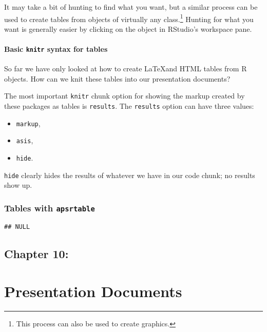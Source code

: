 \documentclass[ChapterTOCs,krantz1]{krantz}\usepackage{graphicx, color}
\makeatletter
\newenvironment{kframe}{%
 \def\at@end@of@kframe{}%
 \ifinner\ifhmode%
  \def\at@end@of@kframe{\end{minipage}}%
  \begin{minipage}{\columnwidth}%
 \fi\fi%
 \def\FrameCommand##1{\hskip\@totalleftmargin \hskip-\fboxsep
 \colorbox{shadecolor}{##1}\hskip-\fboxsep
     \hskip-\linewidth \hskip-\@totalleftmargin \hskip\columnwidth}%
 \MakeFramed {\advance\hsize-\width
   \@totalleftmargin\z@ \linewidth\hsize
   \@setminipage}}%
 {\par\unskip\endMakeFramed%
 \at@end@of@kframe}
\newenvironment{knitrout}{}{} %
\makeatother
\begin{document}
It may take a bit of hunting to find what you want, but a similar process can be used to create tables from objects of virtually any class.\footnote{This process can also be used to create graphics.} Hunting for what you want is generally easier by clicking on the object in RStudio's workspace pane.

\subsection{Basic \texttt{knitr} syntax for tables}

So far we have only looked at how to create \LaTeX and HTML tables from R objects. How can we knit these tables into our presentation documents?

The most important \texttt{knitr} chunk option for showing the markup created by these packages as tables is \texttt{results}. The \texttt{results} option can have three values:

\begin{itemize}
\item
  \texttt{markup},
\item
  \texttt{asis},
\item
  \texttt{hide}.
\end{itemize}
\texttt{hide} clearly hides the results of whatever we have in our code chunk; no results show up.

\section{Tables with \texttt{apsrtable}}



\begin{knitrout}
\color{fgcolor}\begin{kframe}
\begin{verbatim}
## NULL
\end{verbatim}
\end{kframe}
\end{knitrout}


\chapter{Chapter 10:}


\part{Presentation Documents}
\end{document}
